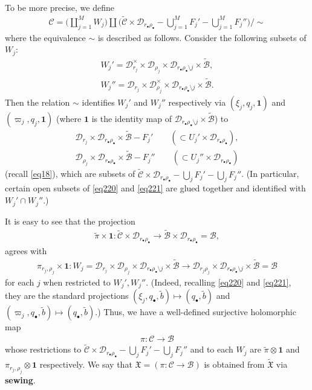 \documentclass[12pt,b5paper,notitlepage]{report}
\theoremstyle{definition}
\theoremstyle{plain}
\newcommand{\fk}{\mathfrak}
\newcommand{\mc}{\mathcal}
\newcommand{\wtd}{\widetilde}
\newcommand{\id}{\mathbf{1}}
\newcommand{\blt}{\bullet}
\numberwithin{equation}{section}
\begin{document}
To be more precise, we define
\begin{align}
\mc C=\bigg(\coprod_{j=1}^MW_j\bigg)\coprod\bigg(\wtd{\mc C}\times \mc D_{r_\blt\rho_\blt}-\bigcup_{j=1}^M F_j'-\bigcup_{j=1}^M F_j''\bigg)\bigg/\sim \label{eq112}
\end{align}
where the equivalence $\sim$ is described as follows. Consider the following subsets of $W_j$:
\begin{gather}
W_j'=\mc D_{r_j}^\times\times\mc D_{\rho_j}\times\mc D_{r_\bullet\rho_\bullet\setminus j}\times\wtd{\mc B},\label{eq66}\\
W_j''= \mc D_{r_j}\times\mc D_{\rho_j}^\times\times\mc D_{r_\bullet\rho_\bullet\setminus j}\times\wtd{\mc B}.\label{eq67}
\end{gather}
Then the relation $\sim$ identifies $W_j'$ and $W_j''$  respectively via $(\xi_j,q_j,\id)$ and $(\varpi_j,q_j,\id)$ (where $\id$ is the identity map of $\mc D_{r_\blt\rho_\blt\setminus j}\times\wtd{\mc B}$) to
\begin{gather}
\mc D_{r_j}\times\mc D_{r_\blt\rho_\blt}\times\wtd{\mc B}-F_j'\qquad (\subset U_j'\times\mc D_{r_\blt\rho_\blt}),\label{eq220}\\
\mc D_{\rho_j}\times\mc D_{r_\blt\rho_\blt}\times\wtd{\mc B}-F_j''\qquad (\subset U_j''\times\mc D_{r_\blt\rho_\blt})\label{eq221}
\end{gather}
(recall \eqref{eq18}), which are subsets of $\wtd{\mc C}\times \mc D_{r_\blt\rho_\blt}-\bigcup_j F_j'-\bigcup_j F_j''$. (In particular, certain open subsets of \eqref{eq220} and \eqref{eq221} are glued together and identified with $W_j'\cap W_j''$.)

It is easy to see that the projection
\begin{align}
\wtd\pi\times \id:\wtd{\mc C}\times \mc D_{r_\blt\rho_\blt}\rightarrow \wtd{\mc B}\times \mc D_{r_\bullet\rho_\bullet}=\mc B,\label{eq234}
\end{align}
agrees with
\begin{gather}
\pi_{r_j,\rho_j}\times \id:W_j=\mc D_{r_j}\times\mc D_{\rho_j}\times\mc D_{r_\bullet\rho_\bullet\setminus j}\times\wtd{\mc B}\rightarrow \mc D_{r_j\rho_j}\times\mc D_{r_\bullet\rho_\bullet\setminus j}\times\wtd{\mc B}=\mc B\label{eq227}
\end{gather}
for each $j$ when restricted to $W_j',W_j''$. (Indeed, recalling \eqref{eq220} and \eqref{eq221}, they are the standard projections $(\xi_j,q_\blt,\wtd b)\mapsto(q_\blt,\wtd b)$ and $(\varpi_j,q_\blt,\wtd b)\mapsto(q_\blt,\wtd b)$.) Thus, we have a well-defined surjective holomorphic map
\begin{align*}
\pi:\mc C\rightarrow\mc B
\end{align*}
whose  restrictions to $\wtd{\mc C}\times \mc D_{r_\blt\rho_\blt}-\bigcup_j F_j'-\bigcup_j F_j''$ and to each $W_j$ are $\wtd\pi\otimes\id$ and $\pi_{r_j,\rho_j}\otimes\id$ respectively. We say that $\fk X=(\pi:\mc C\rightarrow\mc B)$ is obtained from $\wtd{\fk X}$ via \textbf{sewing}. 
\end{document}

